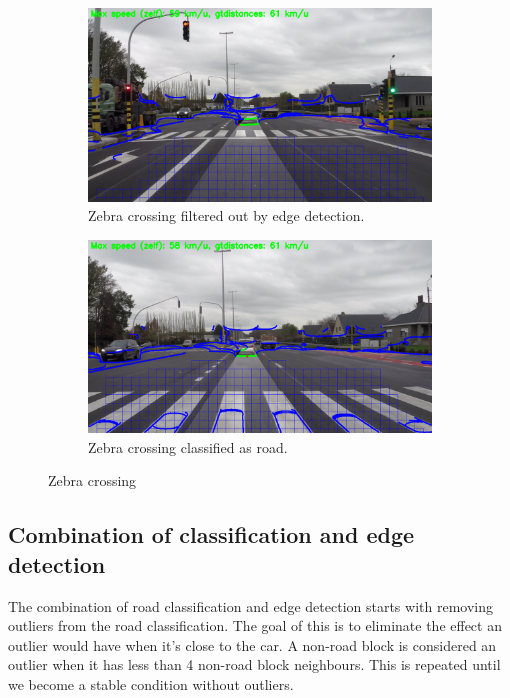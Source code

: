 \documentclass[runningheads,a4paper]{llncs}
\begin{document}
\begin{figure}[t]
\centering
\begin{subfigure}[t]{.5\textwidth}
  \centering
  \includegraphics[width=.9\textwidth]{fig/zebra_edge_filtered.png}
  \caption{Zebra crossing filtered out by edge detection.}
\end{subfigure}%
\begin{subfigure}[t]{.5\textwidth}
  \centering
  \includegraphics[width=.9\textwidth]{fig/zebra_road_filtered.png}
  \caption{Zebra crossing classified as road.}
\end{subfigure}
\caption{Zebra crossing\label{zebra}}
\end{figure}


\subsection{Combination of classification and edge detection}

The combination of road classification and edge detection starts with removing outliers from the road classification. The goal of this is to eliminate the effect an outlier would have when it's close to the car. A non-road block is considered an outlier when it has less than 4 non-road block neighbours. This is repeated until we become a stable condition without outliers. 
\end{document}
